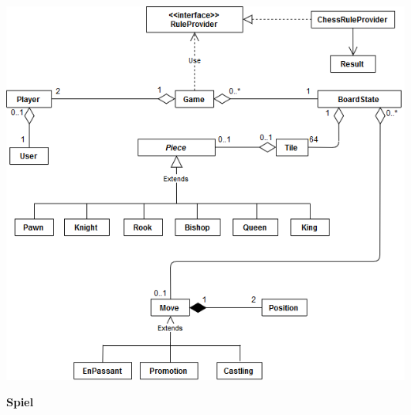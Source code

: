 \documentclass[parskip=full]{scrartcl}
\begin{document}
		\begin{minipage}{\linewidth}
			\centering
			\includegraphics[width=1\linewidth]{Diagramme/TotalGame}
			\label{fig:Spiellogik}
		\end{minipage}
		\newpage
		\textbf{\Large{Spiel}}
\end{document}
